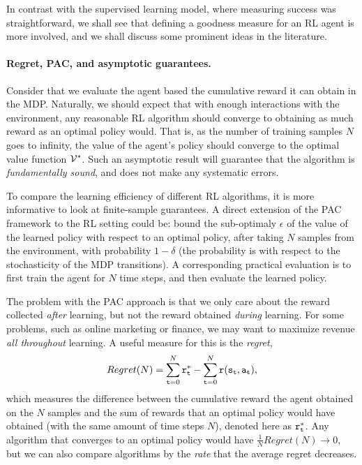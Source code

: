 In contrast with the supervised learning model, where measuring success was straightforward, we shall see that defining a goodness measure for an RL agent is more involved, and we shall discuss some prominent ideas in the literature.

\paragraph{Regret, PAC, and asymptotic guarantees.} Consider that we evaluate the agent based the cumulative reward it can obtain in the MDP. Naturally, we should expect that with enough interactions with the environment, any reasonable RL algorithm should converge to obtaining as much reward as an optimal policy would. That is, as the number of training samples $N$ goes to infinity, the value of the agent's policy should converge to the optimal value function $\mathcal{V}^*$. Such an asymptotic result will guarantee that the algorithm is \textit{fundamentally sound}, and does not make any systematic errors.

To compare the learning efficiency of different RL algorithms, it is more informative to look at finite-sample guarantees. A direct extension of the PAC framework to the RL setting could be: bound the sub-optimaly $\epsilon$ of the value of the learned policy with respect to an optimal policy, after taking $N$ samples from the environment, with probability $1 - \delta$ (the probability is with respect to the stochasticity of the MDP transitions). A corresponding practical evaluation is to first train the agent for $N$ time steps, and then evaluate the learned policy. 

The problem with the PAC approach is that we only care about the reward collected \textit{after} learning, but not the reward obtained \textit{during} learning. For some problems, such as online marketing or finance, we may want to maximize revenue \textit{all throughout} learning. A useful measure for this is the \textit{regret}, 
\begin{equation*}
    Regret(N) = \sum_{{\tt t} = 0}^{N} {\tt r}^*_{\tt t} - \sum_{{\tt t} = 0}^{N} {\tt r}({\tt s}_{\tt t},{\tt a}_{\tt t}),
\end{equation*}
which measures the difference between the cumulative reward the agent obtained on the $N$ samples and the sum of rewards that an optimal policy would have obtained (with the same amount of time steps $N$), denoted here as ${\tt r}^*_{\tt t}$. Any algorithm that converges to an optimal policy would have $\frac{1}{N} Regret(N) \to 0$, but we can also compare algorithms by the \textit{rate} that the average regret decreases.

